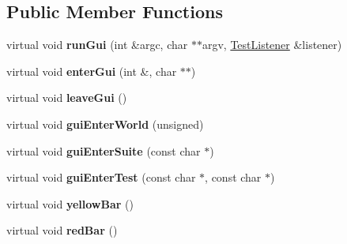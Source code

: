 \subsection*{Public Member Functions}
\begin{DoxyCompactItemize}
\item 
\hypertarget{classCxxTest_1_1GuiListener_aa2473ba3fbc19514724487361761d7f9}{virtual void {\bfseries run\-Gui} (int \&argc, char $\ast$$\ast$argv, \hyperlink{classCxxTest_1_1TestListener}{Test\-Listener} \&listener)}\label{classCxxTest_1_1GuiListener_aa2473ba3fbc19514724487361761d7f9}

\item 
\hypertarget{classCxxTest_1_1GuiListener_aa54cf47bea6e158e8773325604259e2b}{virtual void {\bfseries enter\-Gui} (int \&, char $\ast$$\ast$)}\label{classCxxTest_1_1GuiListener_aa54cf47bea6e158e8773325604259e2b}

\item 
\hypertarget{classCxxTest_1_1GuiListener_aca2b3ffe19f48d917a8694156cef5e21}{virtual void {\bfseries leave\-Gui} ()}\label{classCxxTest_1_1GuiListener_aca2b3ffe19f48d917a8694156cef5e21}

\item 
\hypertarget{classCxxTest_1_1GuiListener_af5f966a34f11f5e4ea4c59ecf83b01e2}{virtual void {\bfseries gui\-Enter\-World} (unsigned)}\label{classCxxTest_1_1GuiListener_af5f966a34f11f5e4ea4c59ecf83b01e2}

\item 
\hypertarget{classCxxTest_1_1GuiListener_ab7f2ec233b21b16a6e080f50cc411695}{virtual void {\bfseries gui\-Enter\-Suite} (const char $\ast$)}\label{classCxxTest_1_1GuiListener_ab7f2ec233b21b16a6e080f50cc411695}

\item 
\hypertarget{classCxxTest_1_1GuiListener_a68e35d61caf85091aa81de1f974f915f}{virtual void {\bfseries gui\-Enter\-Test} (const char $\ast$, const char $\ast$)}\label{classCxxTest_1_1GuiListener_a68e35d61caf85091aa81de1f974f915f}

\item 
\hypertarget{classCxxTest_1_1GuiListener_a6b2b9ab54b7b61dbfdf25abb45bc954b}{virtual void {\bfseries yellow\-Bar} ()}\label{classCxxTest_1_1GuiListener_a6b2b9ab54b7b61dbfdf25abb45bc954b}

\item 
\hypertarget{classCxxTest_1_1GuiListener_ac471a5b189ecfdea1710034d156f7de9}{virtual void {\bfseries red\-Bar} ()}\label{classCxxTest_1_1GuiListener_ac471a5b189ecfdea1710034d156f7de9}


\end{DoxyCompactItemize}
